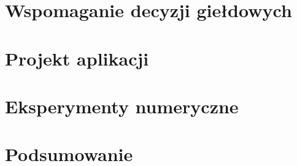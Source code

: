\documentclass[a4paper, twoside, 11pt, openright]{article}
\begin{document}
\newpage

\section{Wspomaganie decyzji giełdowych}

\newpage

\section{Projekt aplikacji}

\newpage

\section{Eksperymenty numeryczne}

\newpage

\section{Podsumowanie}


\newpage
\end{document}
